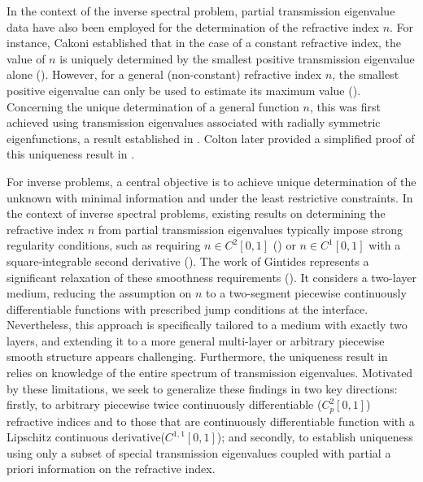 \documentclass[11pt,reqno]{amsart}
\theoremstyle{definition}
\theoremstyle{remark}
\numberwithin{equation}{section}
\begin{document}
In the context of the inverse spectral problem, partial transmission eigenvalue data have also been employed for the determination of the refractive index $n$. For instance, Cakoni established that in the case of a constant refractive index, the value of $n$ is uniquely determined by the smallest positive transmission eigenvalue alone (\cite{CCG10}). However, for a general (non-constant) refractive index $n$, the smallest positive eigenvalue can only be used to estimate its maximum value (\cite{CPS07}). Concerning the unique determination of a general function $n$, this was first achieved using transmission eigenvalues associated with radially symmetric eigenfunctions, a result established in \cite{AGP11}. Colton later provided a simplified proof of this uniqueness result in \cite{CL13}.

For inverse problems, a central objective is to achieve unique determination of the unknown with minimal information and under the least restrictive constraints. In the context of inverse spectral problems, existing results on determining the refractive index $n$ from partial transmission eigenvalues typically impose strong regularity conditions, such as requiring $n\in C^2[0,1]$ (\cite{CL13}) or $n\in C^1[0,1]$ with a square-integrable second derivative (\cite{AGP11}). The work of Gintides represents a significant relaxation of these smoothness requirements (\cite{GP17}). It considers a two-layer medium, reducing the assumption on $n$ to a two-segment piecewise continuously differentiable functions with prescribed jump conditions at the interface. Nevertheless, this approach is specifically tailored to a medium with exactly two layers, and extending it to a more general multi-layer or arbitrary piecewise smooth structure appears challenging. Furthermore, the uniqueness result in \cite{GP17} relies on knowledge of the entire spectrum of transmission eigenvalues. Motivated by these limitations, we seek to generalize these findings in two key directions: firstly, to arbitrary piecewise twice continuously differentiable ($C_p^2[0,1]$) refractive indices and to those that are continuously differentiable function with a Lipschitz continuous derivative($C^{1,1}[0,1]$); and secondly, to establish uniqueness using only a subset of special transmission eigenvalues coupled with partial a priori information on the refractive index.
\end{document}
